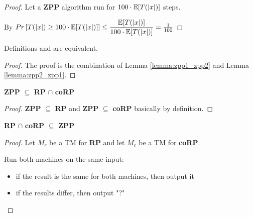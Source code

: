         \begin{proof}
            Let a \textbf{ZPP} algorithm run for $100 \cdot \mathbb{E}[T(\vert x \vert)]$ steps.

           By  $ Pr \left[ T(\vert x \vert) \geq 100 \cdot \mathbb{E}[T(\vert x \vert)] \right] \leq \dfrac{\mathbb{E}[T(\vert x \vert)]}{100 \cdot \mathbb{E}[T(\vert x \vert)]}  = \frac{1}{100} $
        \end{proof}


        \begin{theorem}[\textbf{ZPP}$_1$ $=$ \textbf{ZPP}$_2$]\label{thm:zpp1_zpp2}
            Definitions  and  are equivalent.
        \end{theorem}

        \begin{proof}
            The proof is the combination of Lemma \ref{lemma:zpp1_zpp2} and Lemma \ref{lemma:zpp2_zpp1}.
        \end{proof}


        \begin{lemma}\label{lemma:zpp_in_rp}
            \textbf{ZPP} $\subseteq$ \textbf{RP} $\cap$ \textbf{coRP}
        \end{lemma}

        \begin{proof}
            \textbf{ZPP} $\subseteq$ \textbf{RP} and \textbf{ZPP} $\subseteq$ \textbf{coRP} basically by definition.
        \end{proof}

        \begin{lemma}\label{lemma:rp_in_zpp}
            \textbf{RP} $\cap$ \textbf{coRP} $\subseteq$ \textbf{ZPP}
        \end{lemma}

        \begin{proof}
            Let $M_r$ be a TM for \textbf{RP} and let $M_c$ be a TM for \textbf{coRP}.

            Run both machines on the same input:
            \begin{itemize}
                \item if the result is the same for both machines, then output it
                \item if the results differ, then output "?"
            \end{itemize}
        \end{proof}

